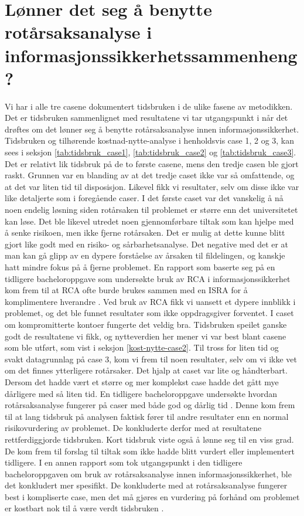 \section{Lønner det seg å benytte rotårsaksanalyse i informasjonssikkerhetssammenheng?}
Vi har i alle tre casene dokumentert tidsbruken i de ulike fasene av metodikken. Det er tidsbruken sammenlignet med resultatene vi tar utgangspunkt i når det drøftes om det lønner seg å benytte rotårsaksanalyse innen informasjonssikkerhet. Tidsbruken og tilhørende kostnad-nytte-analyse i henholdsvis case 1, 2 og 3, kan sees i seksjon \ref{tab:tidsbruk_case1}, \ref{tab:tidsbruk_case2} og \ref{tab:tidsbruk_case3}. Det er relativt lik tidsbruk på de to første casene, mens den tredje casen ble gjort raskt. Grunnen var en blanding av at det tredje caset ikke var så omfattende, og at det var liten tid til disposisjon. Likevel fikk vi resultater, selv om disse ikke var like detaljerte som i foregående caser. I det første caset var det vanskelig å nå noen endelig løsning siden rotårsaken til problemet er større enn det universitetet kan løse. Det ble likevel utredet noen gjennomførbare tiltak som kan hjelpe med å senke risikoen, men ikke fjerne rotårsaken. Det er mulig at dette kunne blitt gjort like godt med en risiko- og sårbarhetsanalyse. Det negative med det er at man kan gå glipp av en dypere forståelse av årsaken til fildelingen, og kanskje hatt mindre fokus på å fjerne problemet. En rapport som baserte seg på en tidligere bacheloroppgave som undersøkte bruk av RCA i informasjonssikkerhet kom frem til at RCA ofte burde brukes sammen med en ISRA for å komplimentere hverandre \cite{Hellesen:1}. Ved bruk av RCA fikk vi uansett et dypere innblikk i problemet, og det ble funnet resultater som ikke oppdragsgiver forventet. I caset om kompromitterte kontoer fungerte det veldig bra. Tidsbruken speilet ganske godt de resultatene vi fikk, og nytteverdien her mener vi var best blant casene som ble utført, som vist i seksjon \ref{kost-nytte-case2}. Til tross for liten tid og svakt datagrunnlag på case 3, kom vi frem til noen resultater, selv om vi ikke vet om det finnes ytterligere rotårsaker. Det hjalp at caset var lite og håndterbart. Dersom det hadde vært et større og mer komplekst case hadde det gått mye dårligere med så liten tid. En tidligere bacheloroppgave undersøkte hvordan rotårsaksanalyse fungerer på caser med både god og dårlig tid \cite{RCARapport}. Denne kom frem til at lang tidsbruk på analysen faktisk fører til andre resultater enn en normal risikovurdering av problemet. De konkluderte derfor med at resultatene rettferdiggjorde tidsbruken. Kort tidsbruk viste også å lønne seg til en viss grad. De kom frem til forslag til tiltak som ikke hadde blitt vurdert eller implementert tidligere. I en annen rapport som tok utgangspunkt i den tidligere bacheloroppgaven om bruk av rotårsaksanalyse innen informasjonssikkerhet, ble det konkludert mer spesifikt. De konkluderte med at rotårsaksanalyse fungerer best i kompliserte case, men det må gjøres en vurdering på forhånd om problemet er kostbart nok til å være verdt tidsbruken \cite{Wangen:1}. 

